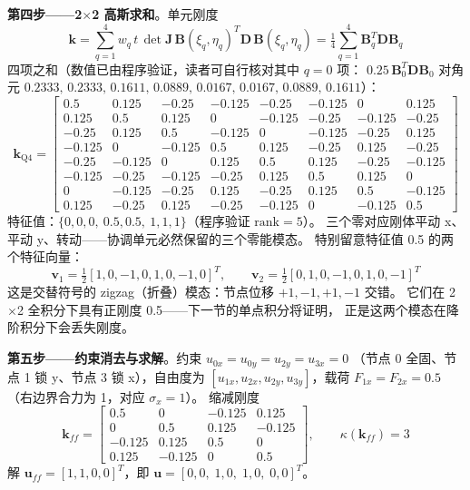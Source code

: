 \documentclass[12pt,a4paper]{ctexart}
\begin{document}
\textbf{第四步——2$\times$2 高斯求和}。单元刚度
\begin{equation}
\mathbf{k} = \sum_{q=1}^{4} w_q\,t\,\det\mathbf{J}\,
\mathbf{B}(\xi_q,\eta_q)^T \mathbf{D}\, \mathbf{B}(\xi_q,\eta_q)
= \tfrac{1}{4}\sum_{q=1}^{4} \mathbf{B}_q^T \mathbf{D} \mathbf{B}_q
\end{equation}
四项之和（数值已由程序验证，读者可自行核对其中 $q=0$ 项：
$0.25\,\mathbf{B}_0^T\mathbf{D}\mathbf{B}_0$ 对角元
$0.2333,\,0.2333,\,0.1611,\,0.0889,\,0.0167,\,0.0167,\,0.0889,\,0.1611$）：
{\small\begin{equation}
\mathbf{k}_{\mathrm{Q4}} = \begin{bmatrix}
0.5 & 0.125 & -0.25 & -0.125 & -0.25 & -0.125 & 0 & 0.125 \\
0.125 & 0.5 & 0.125 & 0 & -0.125 & -0.25 & -0.125 & -0.25 \\
-0.25 & 0.125 & 0.5 & -0.125 & 0 & -0.125 & -0.25 & 0.125 \\
-0.125 & 0 & -0.125 & 0.5 & 0.125 & -0.25 & 0.125 & -0.25 \\
-0.25 & -0.125 & 0 & 0.125 & 0.5 & 0.125 & -0.25 & -0.125 \\
-0.125 & -0.25 & -0.125 & -0.25 & 0.125 & 0.5 & 0.125 & 0 \\
0 & -0.125 & -0.25 & 0.125 & -0.25 & 0.125 & 0.5 & -0.125 \\
0.125 & -0.25 & 0.125 & -0.25 & -0.125 & 0 & -0.125 & 0.5
\end{bmatrix}
\end{equation}}
特征值：$\{0, 0, 0,\ 0.5, 0.5,\ 1, 1, 1\}$（程序验证 $\mathrm{rank}=5$）。
三个零对应刚体平动 x、平动 y、转动——协调单元必然保留的三个零能模态。
特别留意特征值 0.5 的两个特征向量：
\begin{equation}
\mathbf{v}_1 = \tfrac{1}{2}[1,0,-1,0,1,0,-1,0]^T,\qquad
\mathbf{v}_2 = \tfrac{1}{2}[0,1,0,-1,0,1,0,-1]^T
\end{equation}
这是交替符号的 zigzag（折叠）模态：节点位移 $+1,-1,+1,-1$ 交错。
它们在 2$\times$2 全积分下具有正刚度 0.5——下一节的单点积分将证明，
正是这两个模态在降阶积分下会丢失刚度。

\textbf{第五步——约束消去与求解}。约束 $u_{0x}=u_{0y}=u_{2y}=u_{3x}=0$
（节点 0 全固、节点 1 锁 y、节点 3 锁 x），自由度为
$[u_{1x}, u_{2x}, u_{2y}, u_{3y}]$，载荷
$F_{1x}=F_{2x}=0.5$（右边界合力为 1，对应 $\sigma_x=1$）。
缩减刚度
{\small\begin{equation}
\mathbf{k}_{ff} = \begin{bmatrix}
0.5 & 0 & -0.125 & 0.125 \\
0 & 0.5 & 0.125 & -0.125 \\
-0.125 & 0.125 & 0.5 & 0 \\
0.125 & -0.125 & 0 & 0.5
\end{bmatrix},\qquad
\kappa(\mathbf{k}_{ff}) = 3
\end{equation}}
解 $\mathbf{u}_{ff} = [1, 1, 0, 0]^T$，即
$\mathbf{u} = [0,0,\;1,0,\;1,0,\;0,0]^T$。
\end{document}
